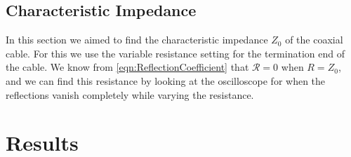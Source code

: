 \documentclass[12pt]{article}
\numberwithin{equation}{section}
\numberwithin{figure}{section}
\begin{document}
    \subsection{Characteristic Impedance}\label{sec:CharacteristicImpedanceMethod}
    In this section we aimed to find the characteristic impedance $Z_0$ of the coaxial cable. 
    For this we use the variable resistance setting for the termination end of the cable. We know 
    from \autoref{eqn:ReflectionCoefficient} that $\mathcal{R}=0$ when $R=Z_0$, and we can find 
    this resistance by looking at the oscilloscope for when the reflections vanish completely 
    while varying the resistance. 

    \section{Results}\label{sec:Results}
\end{document}
